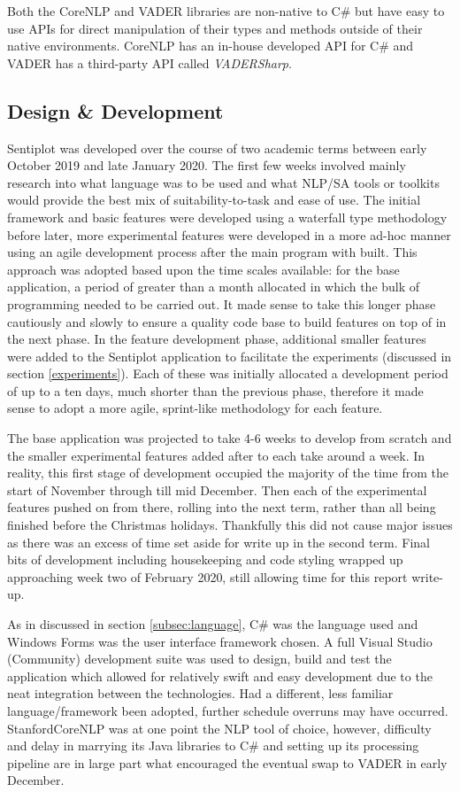 \documentclass{article}
\begin{document}
        Both the CoreNLP and VADER libraries are non-native to C\# but have easy to use APIs for direct manipulation of their types and methods outside of their native environments. CoreNLP has an in-house developed API for C\# and VADER has a third-party API called \textit{VADERSharp}.
    \subsection{Design \& Development}
    \label{subsec:dnd}
        Sentiplot was developed over the course of two academic terms between early October 2019 and late January 2020. The first few weeks involved mainly research into what language was to be used and what NLP/SA tools or toolkits would provide the best mix of suitability-to-task and ease of use. The initial framework and basic features were developed using a waterfall type methodology before later, more experimental features were developed in a more ad-hoc manner using an agile development process after the main program with built. This approach was adopted based upon the time scales available: for the base application, a period of greater than a month allocated in which the bulk of programming needed to be carried out. It made sense to take this longer phase cautiously and slowly to ensure a quality code base to build features on top of in the next phase. In the feature development phase, additional smaller features were added to the Sentiplot application to facilitate the experiments (discussed in section \ref{experiments}). Each of these was initially allocated a development period of up to a ten days, much shorter than the previous phase, therefore it made sense to adopt a more agile, sprint-like methodology for each feature.
        
        The base application was projected to take 4-6 weeks to develop from scratch and the smaller experimental features added after to each take around a week. In reality, this first stage of development occupied the majority of the time from the start of November through till mid December. Then each of the experimental features pushed on from there, rolling into the next term, rather than all being finished before the Christmas holidays. Thankfully this did not cause major issues as there was an excess of time set aside for write up in the second term. Final bits of development including housekeeping and code styling wrapped up approaching week two of February 2020, still allowing time for this report write-up.

        As in discussed in section \ref{subsec:language}, C\# was the language used and Windows Forms was the user interface framework chosen. A full Visual Studio (Community) development suite was used to design, build and test the application which allowed for relatively swift and easy development due to the neat integration between the technologies. Had a different, less familiar language/framework been adopted, further schedule overruns may have occurred. StanfordCoreNLP was at one point the NLP tool of choice, however, difficulty and delay in marrying its Java libraries to C\# and setting up its processing pipeline are in large part what encouraged the eventual swap to VADER in early December.
        
\end{document}
